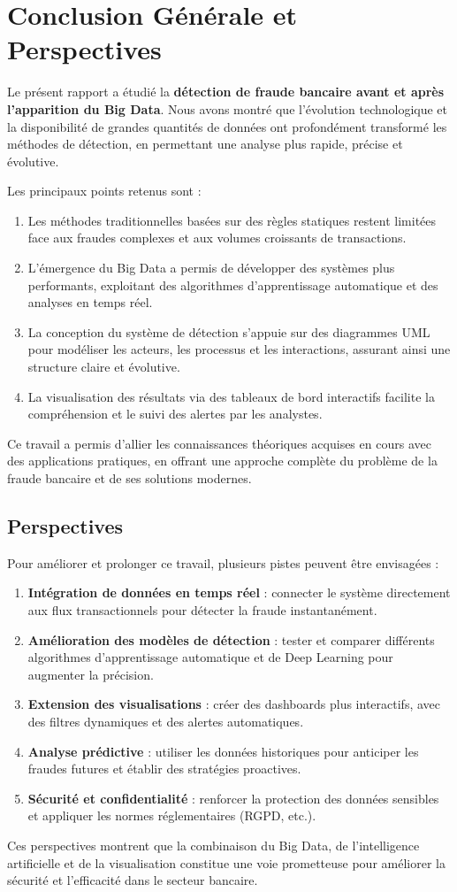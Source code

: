 \chapter*{Conclusion Générale et Perspectives}

Le présent rapport a étudié la \textbf{détection de fraude bancaire avant et après l’apparition du Big Data}. 
Nous avons montré que l’évolution technologique et la disponibilité de grandes quantités de données ont profondément transformé les méthodes de détection, 
en permettant une analyse plus rapide, précise et évolutive.

Les principaux points retenus sont :  
\begin{enumerate}
    \item Les méthodes traditionnelles basées sur des règles statiques restent limitées face aux fraudes complexes et aux volumes croissants de transactions.  
    \item L’émergence du Big Data a permis de développer des systèmes plus performants, exploitant des algorithmes d’apprentissage automatique et des analyses en temps réel.  
    \item La conception du système de détection s’appuie sur des diagrammes UML pour modéliser les acteurs, les processus et les interactions, assurant ainsi une structure claire et évolutive.  
    \item La visualisation des résultats via des tableaux de bord interactifs facilite la compréhension et le suivi des alertes par les analystes.  
\end{enumerate}

Ce travail a permis d’allier les connaissances théoriques acquises en cours avec des applications pratiques, 
en offrant une approche complète du problème de la fraude bancaire et de ses solutions modernes.
\clearpage
\section{Perspectives}
Pour améliorer et prolonger ce travail, plusieurs pistes peuvent être envisagées :  
\begin{enumerate}
    \item \textbf{Intégration de données en temps réel} : connecter le système directement aux flux transactionnels pour détecter la fraude instantanément.  
    \item \textbf{Amélioration des modèles de détection} : tester et comparer différents algorithmes d’apprentissage automatique et de Deep Learning pour augmenter la précision.  
    \item \textbf{Extension des visualisations} : créer des dashboards plus interactifs, avec des filtres dynamiques et des alertes automatiques.  
    \item \textbf{Analyse prédictive} : utiliser les données historiques pour anticiper les fraudes futures et établir des stratégies proactives.  
    \item \textbf{Sécurité et confidentialité} : renforcer la protection des données sensibles et appliquer les normes réglementaires (RGPD, etc.).  
\end{enumerate}

Ces perspectives montrent que la combinaison du Big Data, de l’intelligence artificielle et de la visualisation 
constitue une voie prometteuse pour améliorer la sécurité et l’efficacité dans le secteur bancaire.
